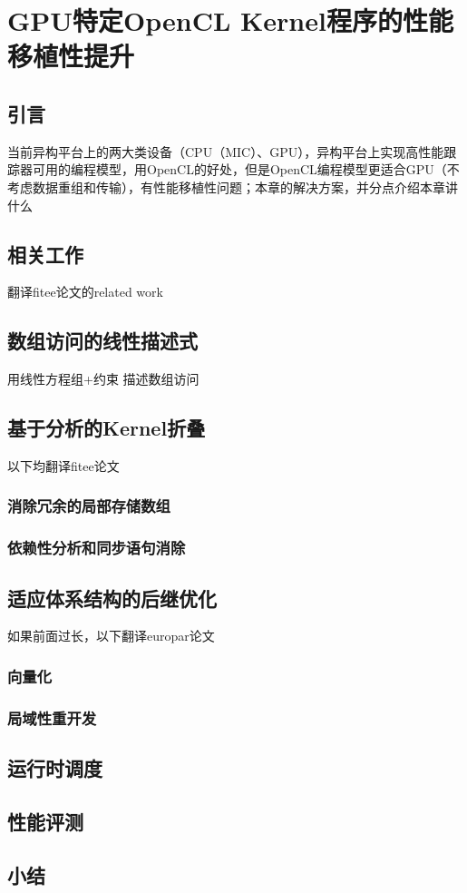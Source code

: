 \chapter{GPU特定OpenCL Kernel程序的性能移植性提升}
\section{引言}
当前异构平台上的两大类设备（CPU（MIC）、GPU），异构平台上实现高性能跟踪器可用的编程模型，用OpenCL的好处，但是OpenCL编程模型更适合GPU（不考虑数据重组和传输），有性能移植性问题；本章的解决方案，并分点介绍本章讲什么

\section{相关工作}
翻译fitee论文的related work

\section{数组访问的线性描述式}
用线性方程组+约束 描述数组访问

\section{基于分析的Kernel折叠}
以下均翻译fitee论文
\subsection{消除冗余的局部存储数组}
\subsection{依赖性分析和同步语句消除}

\section{适应体系结构的后继优化}
如果前面过长，以下翻译europar论文
\subsection{向量化}
\subsection{局域性重开发}

\section{运行时调度}

\section{性能评测}

\section{小结}